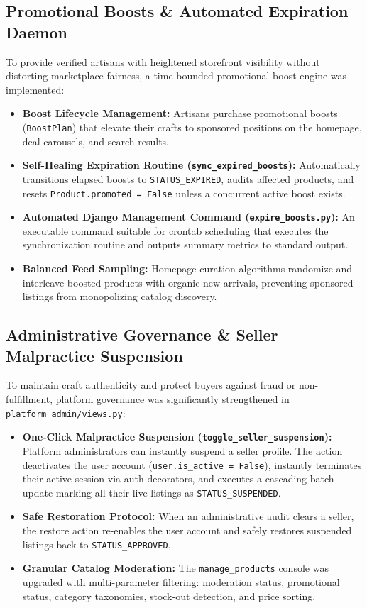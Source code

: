 \documentclass[12pt,a4paper]{article}
\begin{document}
\subsection{Promotional Boosts \& Automated Expiration Daemon}
To provide verified artisans with heightened storefront visibility without distorting marketplace fairness, a time-bounded promotional boost engine was implemented:
\begin{itemize}
    \item \textbf{Boost Lifecycle Management:} Artisans purchase promotional boosts (\texttt{BoostPlan}) that elevate their crafts to sponsored positions on the homepage, deal carousels, and search results.
    \item \textbf{Self-Healing Expiration Routine (\texttt{sync\_expired\_boosts}):} Automatically transitions elapsed boosts to \texttt{STATUS\_EXPIRED}, audits affected products, and resets \texttt{Product.promoted = False} unless a concurrent active boost exists.
    \item \textbf{Automated Django Management Command (\texttt{expire\_boosts.py}):} An executable command suitable for crontab scheduling that executes the synchronization routine and outputs summary metrics to standard output.
    \item \textbf{Balanced Feed Sampling:} Homepage curation algorithms randomize and interleave boosted products with organic new arrivals, preventing sponsored listings from monopolizing catalog discovery.
\end{itemize}

\subsection{Administrative Governance \& Seller Malpractice Suspension}
To maintain craft authenticity and protect buyers against fraud or non-fulfillment, platform governance was significantly strengthened in \texttt{platform\_admin/views.py}:
\begin{itemize}
    \item \textbf{One-Click Malpractice Suspension (\texttt{toggle\_seller\_suspension}):} Platform administrators can instantly suspend a seller profile. The action deactivates the user account (\texttt{user.is\_active = False}), instantly terminates their active session via auth decorators, and executes a cascading batch-update marking all their live listings as \texttt{STATUS\_SUSPENDED}.
    \item \textbf{Safe Restoration Protocol:} When an administrative audit clears a seller, the restore action re-enables the user account and safely restores suspended listings back to \texttt{STATUS\_APPROVED}.
    \item \textbf{Granular Catalog Moderation:} The \texttt{manage\_products} console was upgraded with multi-parameter filtering: moderation status, promotional status, category taxonomies, stock-out detection, and price sorting.
\end{itemize}
\end{document}
